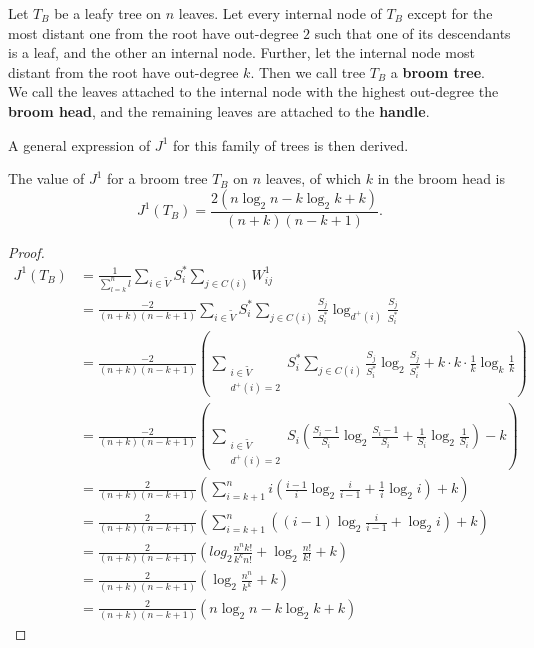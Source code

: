 \begin{definition}
    Let $T_B$ be a leafy tree on $n$ leaves. Let every internal node of $T_B$
    except for the most distant one from the root have out-degree $2$ such that
    one of its descendants is a leaf, and the other an internal node. Further,
    let the internal node most distant from the root have out-degree $k$.
    Then we call tree $T_B$ a \textbf{broom tree}.\\
    We call the leaves attached to the internal node with the highest out-degree
    the \textbf{broom head}, and the remaining leaves are attached to the \textbf{handle}.
\end{definition}
A general expression of $J^1$ for this family of trees is then derived.
\begin{proposition}\label{broom_prop}
    The value of $J^1$ for a broom tree $T_B$ on $n$ leaves, of which $k$ in the broom head is
    \begin{equation}
        J^1(T_B) = \frac{2\left( n \log_2 n - k \log_2 k + k \right)}{(n+k)(n-k+1)}.\label{J1Tb}
    \end{equation}
\end{proposition}
\begin{proof}
    \begin{align*}
        J^1(T_B) &= \frac{1}{\sum_{l=k}^{n}l} \sum_{i\in\tilde{V}} S_i^{*}
        \sum_{j\in C(i)}W_{ij}^{1}\\
        &= \frac{-2}{(n+k)(n-k+1)}\sum_{i \in \tilde{V}} S_i^*\sum_{j\in C(i)}
        \frac{S_j}{S_i^*}\log_{d^+(i)} \frac{S_j}{S_i^*}\\
        &=\frac{-2}{(n+k)(n-k+1)}\left(\sum_{\substack{i \in \tilde{V}\\d^+(i)=2}}
        S_i^*\sum_{j\in C(i)} \frac{S_j}{S_i^*}\log_2\frac{S_j}{S_i^*}+k\cdot
        k\cdot\frac{1}{k}\log_k \frac{1}{k}\right)\\
        &= \frac{-2}{(n+k)(n-k+1)}\left(\sum_{\substack{i \in \tilde{V}\\d^+
        (i)=2}} S_i\left(\frac{S_i-1}{S_i}\log_2\frac{S_i-1}{S_i}+\frac{1}{S_i}
        \log_2\frac{1}{S_i}\right)-k\right)\\
        &= \frac{2}{(n+k)(n-k+1)}\left( \sum_{i=k+1}^{n} i\left( \frac{i-1}{i}
        \log_2\frac{i}{i-1}+\frac{1}{i}\log_2 i \right)+k \right)\\
        &= \frac{2}{(n+k)(n-k+1)}\left(  \sum_{i=k+1}^{n}\left( (i-1)\log_2
        \frac{i}{i-1}+\log_2 i \right) +k \right)\\
        &= \frac{2}{(n+k)(n-k+1)}\left( log_2\frac{n^n k!}{k^k n!}+\log_2
        \frac{n!}{k!}+k \right)\\
        &= \frac{2}{(n+k)(n-k+1)}\left( \log_2\frac{n^n}{k^k}+k \right)\\
        &= \frac{2}{(n+k)(n-k+1)}\left( n \log_2 n - k \log_2 k + k \right)
    \end{align*}
\end{proof}

